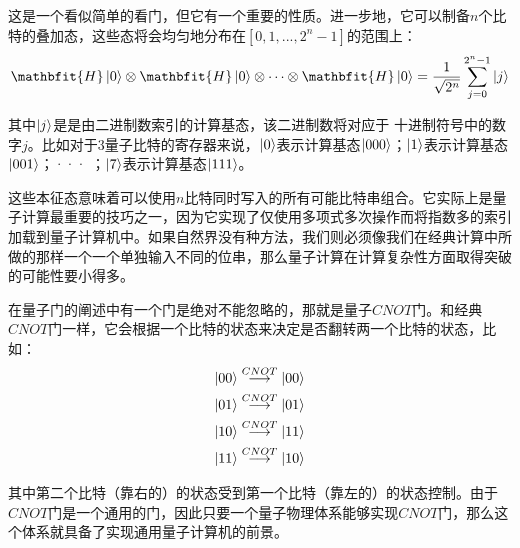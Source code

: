 这是一个看似简单的看门，但它有一个重要的性质。进一步地，它可以制备$n$个比特的叠加态，这些态将会均匀地分布在$[0, 1, ..., 2^n-1]$的范围上：
\begin{align}
    \mathbfit{H}\ket{0}\otimes\mathbfit{H}\ket{0}\otimes\dots\otimes\mathbfit{H}\ket{0}=\frac{1}{\sqrt{2^n}}\sum_{j=0}^{2^n-1}\ket{j}
\end{align}

其中$\ket{j}$是是由二进制数索引的计算基态，该二进制数将对应于 十进制符号中的数字$j$。比如对于$3$量子比特的寄存器来说，$\ket{0}$表示计算基态$\ket{000}$；$\ket{1}$表示计算基态$\ket{001}$；··· ；$\ket{7}$表示计算基态$\ket{111}$。

这些本征态意味着可以使用$n$比特同时写入的所有可能比特串组合。它实际上是量子计算最重要的技巧之一，因为它实现了仅使用多项式多次操作而将指数多的索引加载到量子计算机中。如果自然界没有种方法，我们则必须像我们在经典计算中所做的那样一个一个单独输入不同的位串，那么量子计算在计算复杂性方面取得突破的可能性要小得多。

在量子门的阐述中有一个门是绝对不能忽略的，那就是量子$CNOT$门。和经典$CNOT$门一样，它会根据一个比特的状态来决定是否翻转两一个比特的状态，比如：
\begin{align}
    \ket{00}\overset{CNOT}{\longrightarrow}\ket{00}\\
    \ket{01}\overset{CNOT}{\longrightarrow}\ket{01}\\
    \ket{10}\overset{CNOT}{\longrightarrow}\ket{11}\\
    \ket{11}\overset{CNOT}{\longrightarrow}\ket{10}\\
\end{align}

其中第二个比特（靠右的）的状态受到第一个比特（靠左的）的状态控制。由于$CNOT$门是一个通用的门，因此只要一个量子物理体系能够实现$CNOT$门，那么这个体系就具备了实现通用量子计算机的前景\cite[]{Zajac_Sigillito_Russ_Borjans_Taylor_Burkard_Petta_2018,Zhu_Cheng_Zhu_Chen_Guan_2022}。












